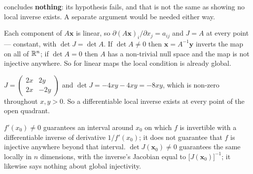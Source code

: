 \begin{solutions}
        concludes \textbf{nothing}: its hypothesis fails, and that is not
        the same as showing no local inverse exists. A separate argument
        would be needed either way.
  \item Each component of $A\mathbf{x}$ is linear, so
        $\partial(A\mathbf{x})_{i}/\partial x_{j}=a_{ij}$ and $J=A$ at every
        point --- constant, with $\det J=\det A$. If $\det A\neq0$ then
        $\mathbf{x}=A^{-1}\mathbf{y}$ inverts the map on all of $\mathbb{R}^{n}$; if
        $\det A=0$ then $A$ has a non-trivial null space and the map is not
        injective anywhere. So for linear maps the local condition is
        already global.
  \item $J=\begin{pmatrix}2x&2y\\2x&-2y\end{pmatrix}$ and
        $\det J=-4xy-4xy=-8xy$, which is non-zero throughout $x,y>0$. So a
        differentiable local inverse exists at every point of the open
        quadrant.
  \item $f'(x_{0})\neq0$ guarantees an interval around $x_{0}$ on which $f$
        is invertible with a differentiable inverse of derivative
        $1/f'(x_{0})$; it does not guarantee that $f$ is injective anywhere
        beyond that interval. $\det J(\mathbf{x}_{0})\neq0$ guarantees the
        same locally in $n$ dimensions, with the inverse's Jacobian equal to
        $\bigl[J(\mathbf{x}_{0})\bigr]^{-1}$; it likewise says nothing about
        global injectivity.


\end{solutions}
